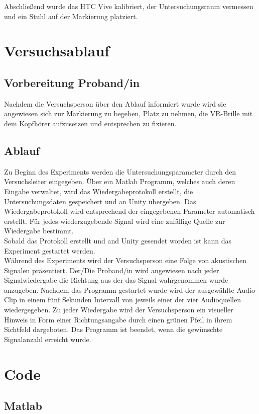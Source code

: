 \newpage
Abschließend wurde das HTC Vive kalibriert, der Untersuchungsraum vermessen und ein Stuhl auf der Markierung platziert.
\section{Versuchsablauf}
\subsection{Vorbereitung Proband/in}
Nachdem die Versuchsperson über den Ablauf informiert wurde wird sie angewiesen sich zur Markierung zu begeben, Platz zu nehmen, die VR-Brille mit dem Kopfhörer aufzusetzen und entsprechen zu fixieren.

\subsection{Ablauf}
Zu Beginn des Experiments werden die Untersuchungsparameter durch den Versuchsleiter eingegeben. Über ein Matlab Programm, welches auch deren Eingabe verwaltet, wird das Wiedergabeprotokoll erstellt, die Untersuchungsdaten gespeichert und an Unity übergeben.
Das Wiedergabeprotokoll wird entsprechend der eingegebenen Parameter automatisch erstellt.
Für jedes wiederzugebende Signal wird eine zufällige Quelle zur Wiedergabe bestimmt.\\
Sobald das Protokoll erstellt und and Unity gesendet worden ist kann das Experiment gestartet werden.\\
Während des Experiments wird der Versuchsperson eine Folge von akustischen Signalen präsentiert. Der/Die Proband/in wird angewiesen nach jeder Signalwiedergabe die Richtung aus der das Signal wahrgenommen wurde anzugeben. Nachdem das Programm gestartet wurde
wird der ausgewählte Audio Clip in einem fünf Sekunden Intervall von jeweils einer der vier Audioquellen wiedergegeben. Zu jeder Wiedergabe wird der Versuchsperson ein visueller Hinweis in Form einer Richtungsangabe durch einen grünen Pfeil in ihrem Sichtfeld dargeboten. Das Programm ist beendet, wenn die gewünschte Signalanzahl erreicht wurde.

\newpage
\section{Code}
\subsection{Matlab}

